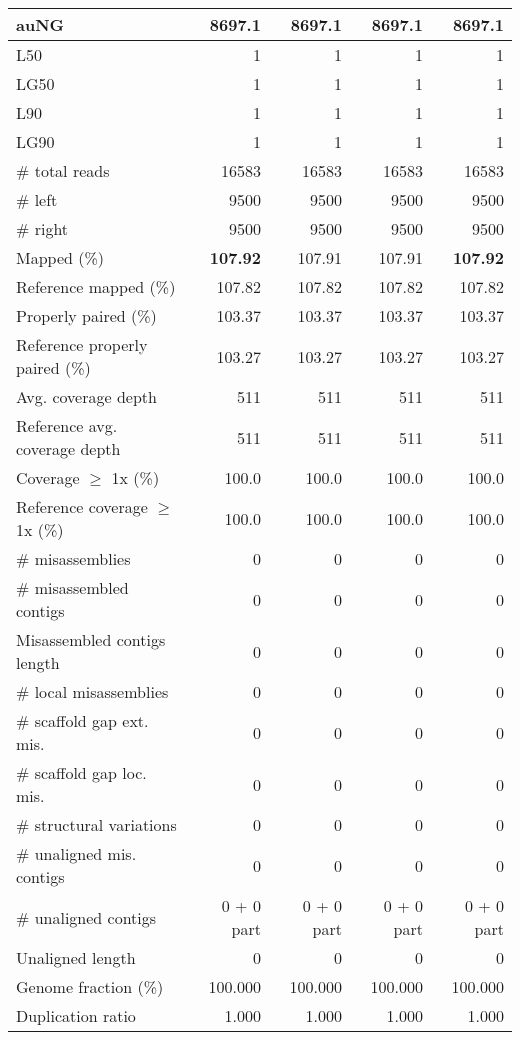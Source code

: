 \documentclass[12pt,a4paper]{article}
\begin{document}
\begin{table}[ht]
\begin{center}
\begin{tabular}{|l*{4}{|r}|}
auNG & 8697.1 & 8697.1 & 8697.1 & 8697.1 \\ \hline
L50 & 1 & 1 & 1 & 1 \\ \hline
LG50 & 1 & 1 & 1 & 1 \\ \hline
L90 & 1 & 1 & 1 & 1 \\ \hline
LG90 & 1 & 1 & 1 & 1 \\ \hline
\# total reads & 16583 & 16583 & 16583 & 16583 \\ \hline
\# left & 9500 & 9500 & 9500 & 9500 \\ \hline
\# right & 9500 & 9500 & 9500 & 9500 \\ \hline
Mapped (\%) & {\bf 107.92} & 107.91 & 107.91 & {\bf 107.92} \\ \hline
Reference mapped (\%) & 107.82 & 107.82 & 107.82 & 107.82 \\ \hline
Properly paired (\%) & 103.37 & 103.37 & 103.37 & 103.37 \\ \hline
Reference properly paired (\%) & 103.27 & 103.27 & 103.27 & 103.27 \\ \hline
Avg. coverage depth & 511 & 511 & 511 & 511 \\ \hline
Reference avg. coverage depth & 511 & 511 & 511 & 511 \\ \hline
Coverage $\geq$ 1x (\%) & 100.0 & 100.0 & 100.0 & 100.0 \\ \hline
Reference coverage $\geq$ 1x (\%) & 100.0 & 100.0 & 100.0 & 100.0 \\ \hline
\# misassemblies & 0 & 0 & 0 & 0 \\ \hline
\# misassembled contigs & 0 & 0 & 0 & 0 \\ \hline
Misassembled contigs length & 0 & 0 & 0 & 0 \\ \hline
\# local misassemblies & 0 & 0 & 0 & 0 \\ \hline
\# scaffold gap ext. mis. & 0 & 0 & 0 & 0 \\ \hline
\# scaffold gap loc. mis. & 0 & 0 & 0 & 0 \\ \hline
\# structural variations & 0 & 0 & 0 & 0 \\ \hline
\# unaligned mis. contigs & 0 & 0 & 0 & 0 \\ \hline
\# unaligned contigs & 0 + 0 part & 0 + 0 part & 0 + 0 part & 0 + 0 part \\ \hline
Unaligned length & 0 & 0 & 0 & 0 \\ \hline
Genome fraction (\%) & 100.000 & 100.000 & 100.000 & 100.000 \\ \hline
Duplication ratio & 1.000 & 1.000 & 1.000 & 1.000 \\ \hline

\end{tabular}
\end{center}
\end{table}
\end{document}

